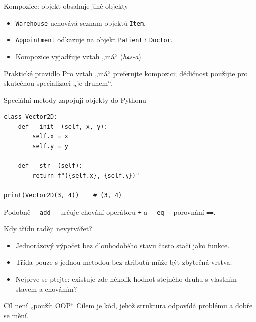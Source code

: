 \documentclass[aspectratio=169]{beamer}
\begin{document}
\begin{frame}{Kompozice: objekt obsahuje jiné objekty}
  \begin{itemize}
    \item \texttt{Warehouse} uchovává seznam objektů \texttt{Item}.
    \item \texttt{Appointment} odkazuje na objekt \texttt{Patient} i \texttt{Doctor}.
    \item Kompozice vyjadřuje vztah „má“ (\emph{has-a}).
  \end{itemize}
  \begin{block}{Praktické pravidlo}
    Pro vztah „má“ preferujte kompozici; dědičnost použijte pro skutečnou specializaci „je druhem“.
  \end{block}
\end{frame}

\begin{frame}[fragile]{Speciální metody zapojují objekty do Pythonu}
\begin{lstlisting}[style=python]
class Vector2D:
    def __init__(self, x, y):
        self.x = x
        self.y = y

    def __str__(self):
        return f"({self.x}, {self.y})"

print(Vector2D(3, 4))    # (3, 4)
\end{lstlisting}
  Podobně \texttt{\_\_add\_\_} určuje chování operátoru \texttt{+} a \texttt{\_\_eq\_\_} porovnání \texttt{==}.
\end{frame}

\begin{frame}{Kdy třídu raději nevytvářet?}
  \begin{itemize}
    \item Jednorázový výpočet bez dlouhodobého stavu často stačí jako funkce.
    \item Třída pouze s jednou metodou bez atributů může být zbytečná vrstva.
    \item Nejprve se ptejte: existuje zde několik hodnot stejného druhu s vlastním stavem a chováním?
  \end{itemize}
  \begin{block}{Cíl není „použít OOP“}
    Cílem je kód, jehož struktura odpovídá problému a dobře se mění.
  \end{block}
\end{frame}
\end{document}
